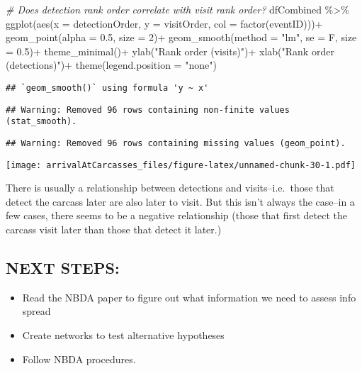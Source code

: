 \documentclass[
]{article}
\newenvironment{Shaded}{\begin{snugshade}}{\end{snugshade}}
\newcommand{\AttributeTok}[1]{\textcolor[rgb]{0.77,0.63,0.00}{#1}}
\newcommand{\CommentTok}[1]{\textcolor[rgb]{0.56,0.35,0.01}{\textit{#1}}}
\newcommand{\DecValTok}[1]{\textcolor[rgb]{0.00,0.00,0.81}{#1}}
\newcommand{\FloatTok}[1]{\textcolor[rgb]{0.00,0.00,0.81}{#1}}
\newcommand{\FunctionTok}[1]{\textcolor[rgb]{0.00,0.00,0.00}{#1}}
\newcommand{\NormalTok}[1]{#1}
\newcommand{\SpecialCharTok}[1]{\textcolor[rgb]{0.00,0.00,0.00}{#1}}
\newcommand{\StringTok}[1]{\textcolor[rgb]{0.31,0.60,0.02}{#1}}
\providecommand{\tightlist}{%
  \setlength{\itemsep}{0pt}\setlength{\parskip}{0pt}}
\begin{document}
\begin{Shaded}
\begin{Highlighting}[]
\CommentTok{\# Does detection rank order correlate with visit rank order?}
\NormalTok{dfCombined }\SpecialCharTok{\%\textgreater{}\%}
  \FunctionTok{ggplot}\NormalTok{(}\FunctionTok{aes}\NormalTok{(}\AttributeTok{x =}\NormalTok{ detectionOrder, }\AttributeTok{y =}\NormalTok{ visitOrder, }\AttributeTok{col =} \FunctionTok{factor}\NormalTok{(eventID)))}\SpecialCharTok{+}
  \FunctionTok{geom\_point}\NormalTok{(}\AttributeTok{alpha =} \FloatTok{0.5}\NormalTok{, }\AttributeTok{size =} \DecValTok{2}\NormalTok{)}\SpecialCharTok{+}
  \FunctionTok{geom\_smooth}\NormalTok{(}\AttributeTok{method =} \StringTok{"lm"}\NormalTok{, }\AttributeTok{se =}\NormalTok{ F, }\AttributeTok{size =} \FloatTok{0.5}\NormalTok{)}\SpecialCharTok{+}
  \FunctionTok{theme\_minimal}\NormalTok{()}\SpecialCharTok{+}
  \FunctionTok{ylab}\NormalTok{(}\StringTok{"Rank order (visits)"}\NormalTok{)}\SpecialCharTok{+}
  \FunctionTok{xlab}\NormalTok{(}\StringTok{"Rank order (detections)"}\NormalTok{)}\SpecialCharTok{+}
  \FunctionTok{theme}\NormalTok{(}\AttributeTok{legend.position =} \StringTok{"none"}\NormalTok{)}
\end{Highlighting}
\end{Shaded}

\begin{verbatim}
## `geom_smooth()` using formula 'y ~ x'
\end{verbatim}

\begin{verbatim}
## Warning: Removed 96 rows containing non-finite values (stat_smooth).
\end{verbatim}

\begin{verbatim}
## Warning: Removed 96 rows containing missing values (geom_point).
\end{verbatim}

\texttt{[image: arrivalAtCarcasses\_files/figure-latex/unnamed-chunk-30-1.pdf]}

There is usually a relationship between detections and
visits--i.e.~those that detect the carcass later are also later to
visit. But this isn't always the case--in a few cases, there seems to be
a negative relationship (those that first detect the carcass visit later
than those that detect it later.)

\hypertarget{next-steps}{%
\subsection{NEXT STEPS:}\label{next-steps}}

\begin{itemize}
\tightlist
\item
  Read the NBDA paper to figure out what information we need to assess
  info spread
\item
  Create networks to test alternative hypotheses
\item
  Follow NBDA procedures.
\end{itemize}
\end{document}

